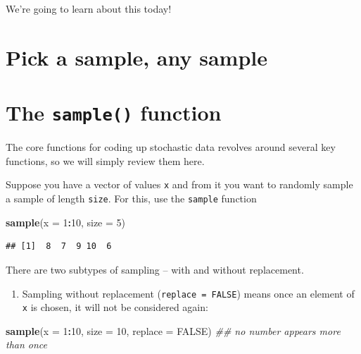 \documentclass[
]{book}
\newenvironment{Shaded}{\begin{snugshade}}{\end{snugshade}}
\newcommand{\CommentTok}[1]{\textcolor[rgb]{0.56,0.35,0.01}{\textit{#1}}}
\newcommand{\DataTypeTok}[1]{\textcolor[rgb]{0.13,0.29,0.53}{#1}}
\newcommand{\DecValTok}[1]{\textcolor[rgb]{0.00,0.00,0.81}{#1}}
\newcommand{\KeywordTok}[1]{\textcolor[rgb]{0.13,0.29,0.53}{\textbf{#1}}}
\newcommand{\NormalTok}[1]{#1}
\newcommand{\OperatorTok}[1]{\textcolor[rgb]{0.81,0.36,0.00}{\textbf{#1}}}
\newcommand{\OtherTok}[1]{\textcolor[rgb]{0.56,0.35,0.01}{#1}}
\providecommand{\tightlist}{%
  \setlength{\itemsep}{0pt}\setlength{\parskip}{0pt}}
\theoremstyle{definition}
\theoremstyle{definition}
\theoremstyle{definition}
\theoremstyle{remark}
\begin{document}
We're going to learn about this today!

\hypertarget{pick-a-sample-any-sample}{%
\section{Pick a sample, any sample}\label{pick-a-sample-any-sample}}

\hypertarget{the-sample-function}{%
\section{\texorpdfstring{The \texttt{sample()} function}{The sample() function}}\label{the-sample-function}}

The core functions for coding up stochastic data revolves around several key functions, so we will simply review them here.

Suppose you have a vector of values \texttt{x} and from it you want to randomly sample a sample of length \texttt{size}. For this, use the \texttt{sample} function

\begin{Shaded}
\begin{Highlighting}[]
\KeywordTok{sample}\NormalTok{(}\DataTypeTok{x =} \DecValTok{1}\OperatorTok{:}\DecValTok{10}\NormalTok{, }\DataTypeTok{size =} \DecValTok{5}\NormalTok{)}
\end{Highlighting}
\end{Shaded}

\begin{verbatim}
## [1]  8  7  9 10  6
\end{verbatim}

There are two subtypes of sampling -- with and without replacement.

\begin{enumerate}
\def\labelenumi{\arabic{enumi}.}
\tightlist
\item
  Sampling without replacement (\texttt{replace\ =\ FALSE}) means once an element of \texttt{x} is chosen, it will not be considered again:
\end{enumerate}

\begin{Shaded}
\begin{Highlighting}[]
\KeywordTok{sample}\NormalTok{(}\DataTypeTok{x =} \DecValTok{1}\OperatorTok{:}\DecValTok{10}\NormalTok{, }\DataTypeTok{size =} \DecValTok{10}\NormalTok{, }\DataTypeTok{replace =} \OtherTok{FALSE}\NormalTok{) }\CommentTok{\#\# no number appears more than once}
\end{Highlighting}
\end{Shaded}
\end{document}
